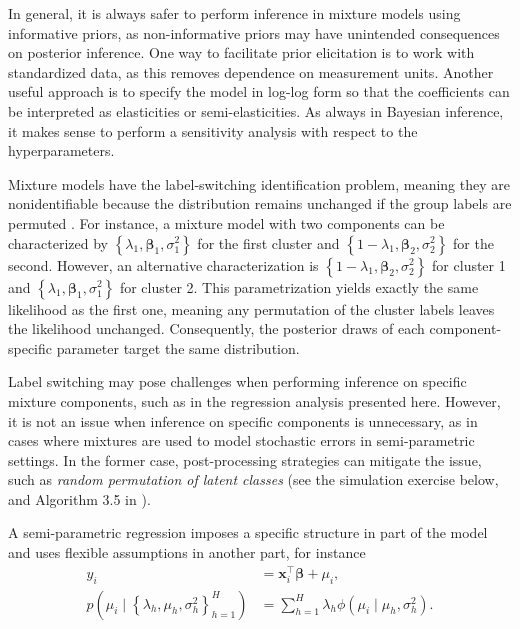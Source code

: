 In general, it is always safer to perform inference in mixture models using informative priors, as non-informative priors may have unintended consequences on posterior inference. One way to facilitate prior elicitation is to work with standardized data, as this removes dependence on measurement units. Another useful approach is to specify the model in log-log form so that the coefficients can be interpreted as elasticities or semi-elasticities. As always in Bayesian inference, it makes sense to perform a sensitivity analysis with respect to the hyperparameters.

Mixture models have the label-switching identification problem, meaning they are nonidentifiable because the distribution remains unchanged if the group labels are permuted \cite{van2011bayesian}. For instance, a mixture model with two components can be characterized by $\left\{\lambda_1,\boldsymbol{\beta}_1,\sigma_1^2\right\}$ for the first cluster and $\left\{1-\lambda_1,\boldsymbol{\beta}_2,\sigma_2^2\right\}$ for the second. However, an alternative characterization is $\left\{1-\lambda_1,\boldsymbol{\beta}_2,\sigma_2^2\right\}$ for cluster 1 and $\left\{\lambda_1,\boldsymbol{\beta}_1,\sigma_1^2\right\}$ for cluster 2. This parametrization yields exactly the same likelihood as the first one, meaning any permutation of the cluster labels leaves the likelihood unchanged. Consequently, the posterior draws of each component-specific parameter target the same distribution.

Label switching may pose challenges when performing inference on specific mixture components, such as in the regression analysis presented here. However, it is not an issue when inference on specific components is unnecessary, as in cases where mixtures are used to model stochastic errors in semi-parametric settings. In the former case, post-processing strategies can mitigate the issue, such as \textit{random permutation of latent classes} (see the simulation exercise below, \cite[p.~534]{gelman2021bayesian} and Algorithm 3.5 in \cite[p.~82]{fruhwirth2006finite}). 

A semi-parametric regression imposes a specific structure in part of the model and uses flexible assumptions in another part, for instance
\begin{align*}
	y_i&=\boldsymbol{x}_i^{\top}\boldsymbol{\beta}+\mu_i,\\
	p(\mu_i \mid \left\{\lambda_h,\mu_h,\sigma_h^2\right\}_{h=1}^H)&=\sum_{h=1}^H\lambda_h\phi(\mu_i\mid \mu_h,\sigma_h^2). 
\end{align*}

